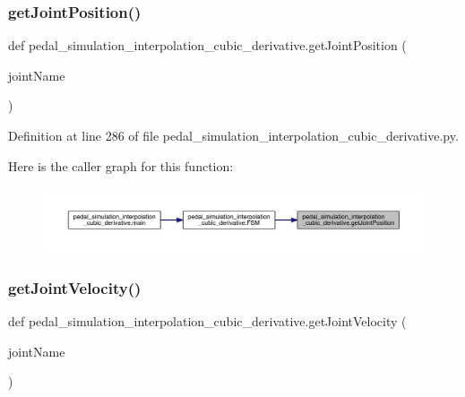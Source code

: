 \subsubsection{\texorpdfstring{getJointPosition()}{getJointPosition()}}
{\footnotesize\ttfamily def pedal\+\_\+simulation\+\_\+interpolation\+\_\+cubic\+\_\+derivative.\+get\+Joint\+Position (\begin{DoxyParamCaption}\item[{}]{joint\+Name }\end{DoxyParamCaption})}



Definition at line 286 of file pedal\+\_\+simulation\+\_\+interpolation\+\_\+cubic\+\_\+derivative.\+py.


\begin{DoxyCode}{0}

\end{DoxyCode}
Here is the caller graph for this function\+:\nopagebreak
\begin{figure}[H]
\begin{center}
\leavevmode
\includegraphics[width=350pt]{namespacepedal__simulation__interpolation__cubic__derivative_a315fe4c5bd2622f2d56a0fc6c3c5e143_icgraph}
\end{center}
\end{figure}
\mbox{\label{namespacepedal__simulation__interpolation__cubic__derivative_a24deb6472cb7522ba7982e8b0d12a4cf}} 
\subsubsection{\texorpdfstring{getJointVelocity()}{getJointVelocity()}}
{\footnotesize\ttfamily def pedal\+\_\+simulation\+\_\+interpolation\+\_\+cubic\+\_\+derivative.\+get\+Joint\+Velocity (\begin{DoxyParamCaption}\item[{}]{joint\+Name }\end{DoxyParamCaption})}



